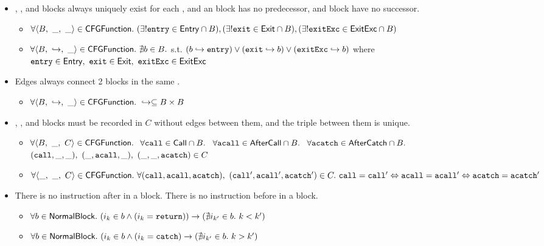 \begin{itemize}
\item \Entry, \Exit, and \ExitExc blocks always uniquely exist for each \CFGFunction,
and an \Entry block has no predecessor, \Exit and \ExitExc block have no successor.
\begin{itemize}
\item $\forall \langle B,\ \_,\ \_ \rangle \in \mbox{\textsf{CFGFunction}}.\ (\exists! \mbox{\texttt{entry}} \in \mbox{\textsf{Entry}} \cap B), (\exists! \mbox{\texttt{exit}} \in \mbox{\textsf{Exit}} \cap B),
(\exists! \mbox{\texttt{exitExc}} \in \mbox{\textsf{ExitExc}} \cap B)$
\item $\forall \langle B,\ \hookrightarrow,\ \_ \rangle \in \CFGFunction.\ \nexists b \in B.$
s.t. $(b \hookrightarrow \mbox{\texttt{entry}}) \vee (\mbox{\texttt{exit}} \hookrightarrow b) \vee (\mbox{\texttt{exitExc}} \hookrightarrow b)$
where $\mbox{\texttt{entry}} \in \mbox{\textsf{Entry}},\ \mbox{\texttt{exit}} \in \mbox{\textsf{Exit}},\ \mbox{\texttt{exitExc}} \in \mbox{\textsf{ExitExc}}$
\end{itemize}

\item Edges always connect 2 blocks in the same \CFGFunction.
\begin{itemize}
\item $\forall \langle B,\ \hookrightarrow,\ \_ \rangle \in \CFGFunction.\ \hookrightarrow \subseteq B \times B$
\end{itemize}

\item \Call, \AfterCall, and \AfterCatch blocks must be recorded in $C$ without edges between them, and the triple between them is unique.
\begin{itemize}
\item $\forall \langle B,\ \_,\ C \rangle \in \mbox{\textsf{CFGFunction}}.\ $
$\forall \mbox{\texttt{call}} \in \mbox{\textsf{Call}} \cap B.\ $
$\forall \mbox{\texttt{acall}} \in \mbox{\textsf{AfterCall}} \cap B.\ $
$\forall \mbox{\texttt{acatch}} \in \mbox{\textsf{AfterCatch}} \cap B.\ $
$(\mbox{\texttt{call}}, \_, \_),\ (\_, \mbox{\texttt{acall}}, \_),\ (\_, \_, \mbox{\texttt{acatch}}) \in C$
\item $\forall \langle \_,\ \_,\ C \rangle \in \mbox{\textsf{CFGFunction}}.\ \forall (\mbox{\texttt{call}}, \mbox{\texttt{acall}}, \mbox{\texttt{acatch}}),\ (\mbox{\texttt{call}}', \mbox{\texttt{acall}}', \mbox{\texttt{acatch}}') \in C.\ \mbox{\texttt{call}} = \mbox{\texttt{call}}' \Leftrightarrow \mbox{\texttt{acall}} = \mbox{\texttt{acall}}' \Leftrightarrow \mbox{\texttt{acatch}} = \mbox{\texttt{acatch}}'$
\end{itemize}

\item There is no instruction after  in a block. There is no instruction before  in a block.
\begin{itemize}
\item $\forall b \in \mbox{\textsf{NormalBlock}}.\ (i_k \in b \wedge (i_k = \mbox{\texttt{return}})) \rightarrow (\nexists i_{k'} \in b.\ k < k')$
\item $\forall b \in \mbox{\textsf{NormalBlock}}.\ (i_k \in b \wedge (i_k = \mbox{\texttt{catch}}) \rightarrow (\nexists i_{k'} \in b.\ k > k')$
\end{itemize}

\end{itemize}
\newpage


